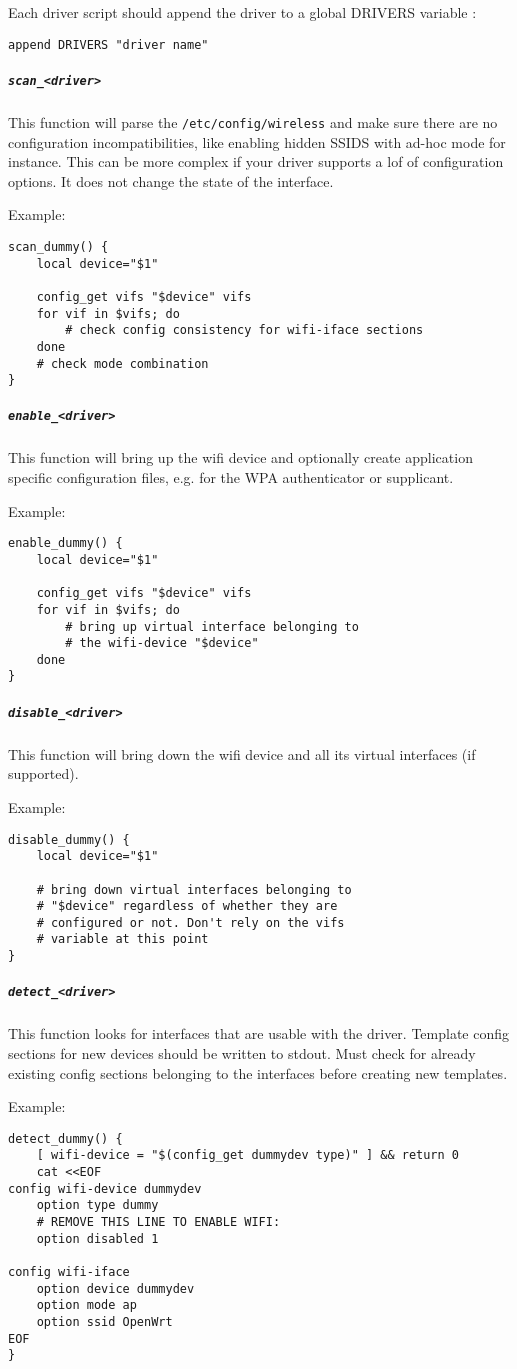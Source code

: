 Each driver script should append the driver to a global DRIVERS variable :

\begin{Verbatim}
append DRIVERS "driver name"
\end{Verbatim}

\subparagraph{\texttt{scan\_<driver>}}

This function will parse the \texttt{/etc/config/wireless} and make sure there
are no configuration incompatibilities, like enabling hidden SSIDS with ad-hoc mode
for instance. This can be more complex if your driver supports a lof of configuration
options. It does not change the state of the interface.

Example:
\begin{Verbatim}
scan_dummy() {
	local device="$1"

	config_get vifs "$device" vifs
	for vif in $vifs; do
		# check config consistency for wifi-iface sections
	done
	# check mode combination
}
\end{Verbatim}

\subparagraph{\texttt{enable\_<driver>}}

This function will bring up the wifi device and optionally create application specific
configuration files, e.g. for the WPA authenticator or supplicant.

Example:
\begin{Verbatim}
enable_dummy() {
	local device="$1"

	config_get vifs "$device" vifs
	for vif in $vifs; do
		# bring up virtual interface belonging to
		# the wifi-device "$device"
	done
}
\end{Verbatim}

\subparagraph{\texttt{disable\_<driver>}}

This function will bring down the wifi device and all its virtual interfaces (if supported).

Example:
\begin{Verbatim}
disable_dummy() {
	local device="$1"

	# bring down virtual interfaces belonging to
	# "$device" regardless of whether they are
	# configured or not. Don't rely on the vifs
	# variable at this point
}
\end{Verbatim}

\subparagraph{\texttt{detect\_<driver>}}

This function looks for interfaces that are usable with the driver. Template config sections
for new devices should be written to stdout. Must check for already existing config sections
belonging to the interfaces before creating new templates.

Example:
\begin{Verbatim}
detect_dummy() {
	[ wifi-device = "$(config_get dummydev type)" ] && return 0
	cat <<EOF
config wifi-device dummydev
	option type dummy
	# REMOVE THIS LINE TO ENABLE WIFI:
	option disabled 1

config wifi-iface
	option device dummydev
	option mode ap
	option ssid OpenWrt
EOF
}
\end{Verbatim}
